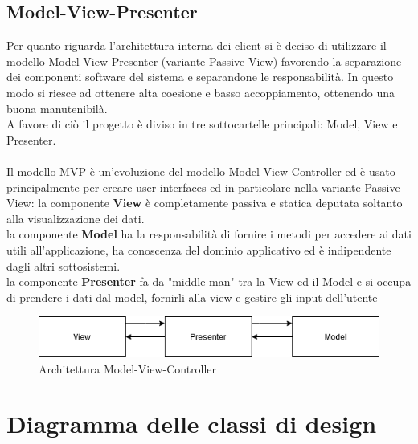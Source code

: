\subsection{Model-View-Presenter}
Per quanto riguarda l'architettura interna dei client si è deciso di utilizzare il modello Model-View-Presenter (variante Passive View)
favorendo la separazione dei componenti software del sistema e separandone le responsabilità.
In questo modo si riesce ad ottenere alta coesione e basso accoppiamento, ottenendo una buona manutenibilà.\\
A favore di ciò il progetto è diviso in tre sottocartelle principali: Model, View e Presenter.\\
\\
Il modello MVP è un'evoluzione del modello Model View Controller ed è usato principalmente per creare user interfaces 
ed in particolare nella variante Passive View:
la componente \textbf{View} è completamente passiva e statica deputata soltanto alla visualizzazione dei dati.\\
la componente \textbf{Model} ha la responsabilità di fornire i metodi per accedere
ai dati utili all'applicazione, ha conoscenza del dominio applicativo ed è indipendente
dagli altri sottosistemi.\\
la componente \textbf{Presenter} fa da "middle man" tra la View ed il Model e si occupa di prendere i dati dal model, 
fornirli alla view e gestire gli input dell'utente
\begin{center}
    \begin{figure}[H]
        \includegraphics[width=\textwidth]{Figures/MVP client.png}
        \caption{Architettura Model-View-Controller}
    \end{figure}
\end{center}
\section{Diagramma delle classi di design}
